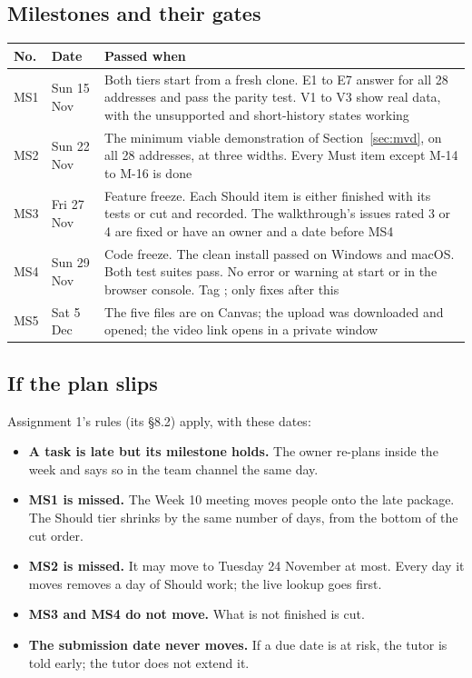 \subsection{Milestones and their gates}
\label{sec:milestones}

\begin{center}
\small
\begin{tabularx}{\textwidth}{@{}L{1.0cm}L{2.2cm}Y@{}}
\toprule
\textbf{No.} & \textbf{Date} & \textbf{Passed when} \\
\midrule
MS1 & Sun 15 Nov & Both tiers start from a fresh clone. E1 to E7 answer for all 28 addresses and pass the parity test. V1 to V3 show real data, with the unsupported and short-history states working \\
MS2 & Sun 22 Nov & The minimum viable demonstration of Section~\ref{sec:mvd}, on all 28 addresses, at three widths. Every Must item except M-14 to M-16 is done \\
MS3 & Fri 27 Nov & Feature freeze. Each Should item is either finished with its tests or cut and recorded. The walkthrough's issues rated 3 or 4 are fixed or have an owner and a date before MS4 \\
MS4 & Sun 29 Nov & Code freeze. The clean install passed on Windows and macOS. Both test suites pass. No error or warning at start or in the browser console. Tag ; only fixes after this \\
MS5 & Sat 5 Dec & The five files are on Canvas; the upload was downloaded and opened; the video link opens in a private window \\
\bottomrule
\end{tabularx}
\end{center}

\subsection{If the plan slips}
\label{sec:variance}

Assignment 1's rules (its §8.2) apply, with these dates:

\begin{itemize}
  \item \textbf{A task is late but its milestone holds.} The owner re-plans inside the week and
    says so in the team channel the same day.
  \item \textbf{MS1 is missed.} The Week 10 meeting moves people onto the late package. The Should
    tier shrinks by the same number of days, from the bottom of the cut order.
  \item \textbf{MS2 is missed.} It may move to Tuesday 24 November at most. Every day it moves
    removes a day of Should work; the live lookup goes first.
  \item \textbf{MS3 and MS4 do not move.} What is not finished is cut.
  \item \textbf{The submission date never moves.} If a due date is at risk, the tutor is told
    early; the tutor does not extend it.
\end{itemize}
